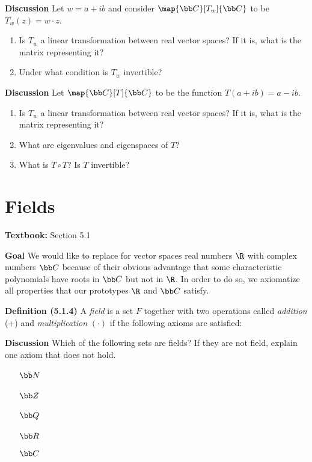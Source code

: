 \documentclass[letterpaper, 10pt]{article}
\begin{document}
\newpage
\lb
\textbf{Discussion}
\lb
Let $w = a+ ib$ and consider $\map{\bb C}[T_w]{\bb C}$ to be $T_w(z) = w \cdot z$.
\begin{enumerate}
    \item Is $T_w$ a linear transformation between real vector spaces? If it is, what is the
        matrix representing it?
    \item Under what condition is $T_w$ invertible?
\end{enumerate}


\newpage
\lb
\textbf{Discussion}
\lb
Let  $\map{\bb C}[T]{\bb C}$ to be the function $T(a + ib) = a - ib$.
\begin{enumerate}
    \item Is $T_w$ a linear transformation between real vector spaces? If it is, what is the
        matrix representing it?
    \item What are eigenvalues and eigenspaces of $T$?
    \item What is $T \circ T$? Is $T$ invertible?
\end{enumerate}














\newpage
\section*{Fields}%
\textbf{Textbook:} Section 5.1

\lb
\textbf{Goal}
\lb
We would like to replace for vector spaces real numbers $\R$ with complex numbers $\bb C$
because of their obvious advantage that some characteristic polynomials have roots in $\bb C$
but not in $\R$.
In order to do so, we axiomatize all properties that our prototypes $\R$ and $\bb C$ satisfy.


\lb
\textbf{Definition (5.1.4)}
\lb
A \emph{field} is a set $F$ together with two operations called
\emph{addition} (+) and \emph{multiplication} $( \cdot )$ if the following axioms are satisfied:



\newpage
\lb
\textbf{Discussion}
\lb
Which of the following sets are fields? If they are not field,
explain one axiom that does not hold.
\begin{enumerate}
    \item[$\bb N$]
    ~\vspace{20pt}
    \item[$\bb Z$]
    ~\vspace{20pt}
    \item[$\bb Q$]
    ~\vspace{20pt}
    \item[$\bb R$]
    ~\vspace{20pt}
    \item[$\bb C$]
\end{enumerate}
\end{document}
